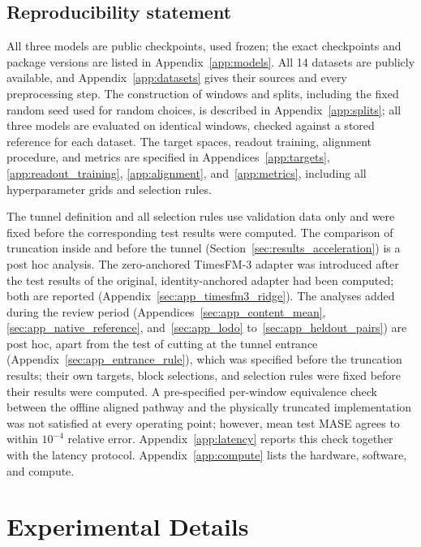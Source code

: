 \documentclass{article} %
\begin{document}
\subsection*{Reproducibility statement}

All three models are public checkpoints, used frozen; the exact checkpoints and package versions are listed in Appendix~\ref{app:models}. All 14 datasets are publicly available, and Appendix~\ref{app:datasets} gives their sources and every preprocessing step. The construction of windows and splits, including the fixed random seed used for random choices, is described in Appendix~\ref{app:splits}; all three models are evaluated on identical windows, checked against a stored reference for each dataset. The target spaces, readout training, alignment procedure, and metrics are specified in Appendices~\ref{app:targets}, \ref{app:readout_training}, \ref{app:alignment}, and~\ref{app:metrics}, including all hyperparameter grids and selection rules.

The tunnel definition and all selection rules use validation data only and were fixed before the corresponding test results were computed. The comparison of truncation inside and before the tunnel (Section~\ref{sec:results_acceleration}) is a post hoc analysis. The zero-anchored TimesFM-3 adapter was introduced after the test results of the original, identity-anchored adapter had been computed; both are reported (Appendix~\ref{sec:app_timesfm3_ridge}). The analyses added during the review period (Appendices~\ref{sec:app_content_mean}, \ref{sec:app_native_reference}, and~\ref{sec:app_lodo} to~\ref{sec:app_heldout_pairs}) are post hoc, apart from the test of cutting at the tunnel entrance (Appendix~\ref{sec:app_entrance_rule}), which was specified before the truncation results; their own targets, block selections, and selection rules were fixed before their results were computed. A pre-specified per-window equivalence check between the offline aligned pathway and the physically truncated implementation was not satisfied at every operating point; however, mean test MASE agrees to within $10^{-4}$ relative error. Appendix~\ref{app:latency} reports this check together with the latency protocol. Appendix~\ref{app:compute} lists the hardware, software, and compute.







\clearpage
\appendix
\section{Experimental Details}
\label{app:experimental_details}
\end{document}
